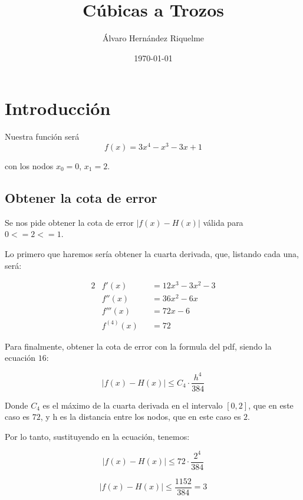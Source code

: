 \documentclass{article}
\title{Cúbicas a Trozos}
\author{Álvaro Hernández Riquelme}
\date{\today}
\begin{document}

\maketitle
\tableofcontents
\newpage

\section{Introducción}

Nuestra función será
\begin{equation}
f(x) = 3x^4 - x^3 - 3x + 1
\end{equation}

con los nodos $x_0 = 0$, $x_1 = 2$.

\subsection{Obtener la cota de error}

Se nos pide obtener la cota de error $|f(x)-H(x)|$ válida para $0<=2<=1$.

Lo primero que haremos sería obtener la cuarta derivada, que, listando cada una, será:

\begin{alignat*}{2}
&f'(x) &&= 12x^3 - 3x^2 - 3 \\
&f''(x) &&= 36x^2 - 6x \\
&f'''(x) &&= 72x - 6 \\
&f^{(4)}(x) &&= 72
\end{alignat*}

Para finalmente, obtener la cota de error con la formula del pdf, siendo la ecuación $16$:

\begin{equation}
|f(x) - H(x)| \leq C_4 \cdot \frac{h^4}{384}
\end{equation}

Donde $C_4$ es el máximo de la cuarta derivada en el intervalo $[0,2]$, que en este caso es $72$, y h es la distancia entre los nodos, que en este caso es $2$.

Por lo tanto, sustituyendo en la ecuación, tenemos:

\begin{equation}
|f(x) - H(x)| \leq 72 \cdot \frac{2^4}{384}
\end{equation}

\begin{equation}
|f(x) - H(x)| \leq \frac{1152}{384} = 3
\end{equation}
\end{document}
